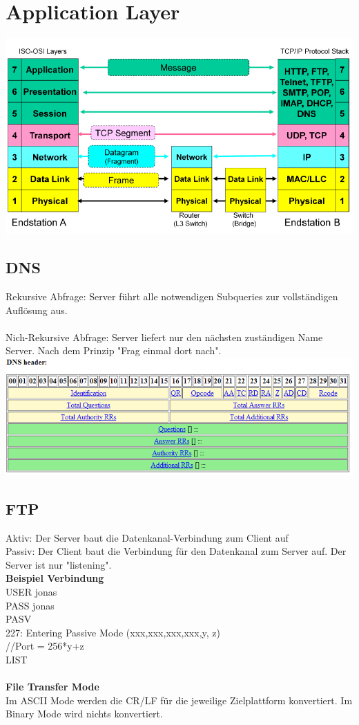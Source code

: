 \section{Application Layer}

\includegraphics[scale=0.5]{media/osimodel.png}

\subsection{DNS}
Rekursive Abfrage: Server führt alle notwendigen Subqueries zur vollständigen Auflösung aus.\\\\
Nich-Rekursive Abfrage: Server liefert nur den nächsten zuständigen Name Server. Nach dem Prinzip "Frag einmal dort nach".\\
\includegraphics[scale=0.8]{media/DNSHeader.png}

\subsection{FTP}
Aktiv: Der Server baut die Datenkanal-Verbindung zum Client auf\\
Passiv: Der Client baut die Verbindung für den Datenkanal zum Server auf. Der Server ist nur "listening".\\
\textbf{Beispiel Verbindung} \\
USER jonas\\
PASS jonas\\
PASV\\
227: Entering Passive Mode (xxx,xxx,xxx,xxx,y, z)\\
//Port = 256*y+z\\
LIST\\
\\
\textbf{File Transfer Mode}\\
Im ASCII Mode werden die CR/LF für die jeweilige Zielplattform konvertiert.
Im Binary Mode wird nichts konvertiert.

